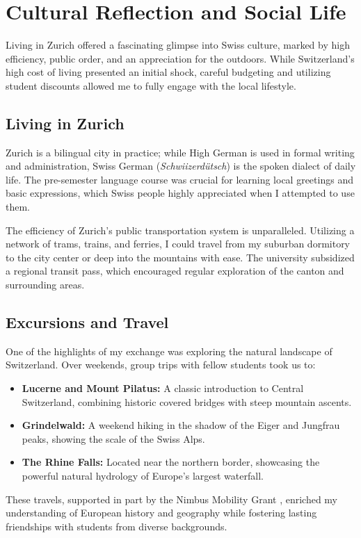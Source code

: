 \section{Cultural Reflection and Social Life}
\label{sec:cultural_reflection}

Living in Zurich offered a fascinating glimpse into Swiss culture, marked by high efficiency, public order, and an appreciation for the outdoors. While Switzerland's high cost of living presented an initial shock, careful budgeting and utilizing student discounts allowed me to fully engage with the local lifestyle.

\subsection{Living in Zurich}
Zurich is a bilingual city in practice; while High German is used in formal writing and administration, Swiss German (\emph{Schwiizerdütsch}) is the spoken dialect of daily life. The pre-semester language course was crucial for learning local greetings and basic expressions, which Swiss people highly appreciated when I attempted to use them.

The efficiency of Zurich's public transportation system is unparalleled. Utilizing a network of trams, trains, and ferries, I could travel from my suburban dormitory to the city center or deep into the mountains with ease. The university subsidized a regional transit pass, which encouraged regular exploration of the canton and surrounding areas.

\subsection{Excursions and Travel}
One of the highlights of my exchange was exploring the natural landscape of Switzerland. Over weekends, group trips with fellow students took us to:
\begin{itemize}
  \item \textbf{Lucerne and Mount Pilatus:} A classic introduction to Central Switzerland, combining historic covered bridges with steep mountain ascents.
  \item \textbf{Grindelwald:} A weekend hiking in the shadow of the Eiger and Jungfrau peaks, showing the scale of the Swiss Alps.
  \item \textbf{The Rhine Falls:} Located near the northern border, showcasing the powerful natural hydrology of Europe's largest waterfall.
\end{itemize}

These travels, supported in part by the Nimbus Mobility Grant \cite{nimbus2025report}, enriched my understanding of European history and geography while fostering lasting friendships with students from diverse backgrounds.
